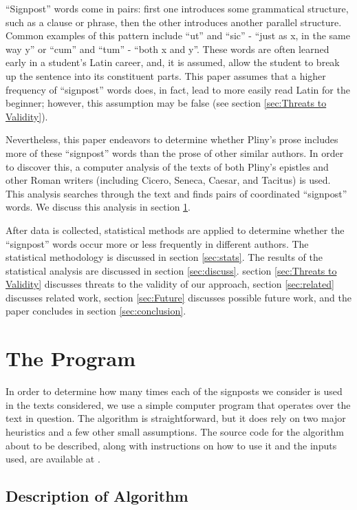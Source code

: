 ``Signpost'' words come in pairs: first one introduces some grammatical structure, such as a clause or phrase, then the other introduces another parallel structure. Common examples of this pattern include ``ut'' and ``sic'' - ``just as x, in the same way y'' or ``cum'' and ``tum'' - ``both x and y''. These words are often learned early in a student's Latin career, and, it is assumed, allow the student to break up the sentence into its constituent parts. This paper assumes that a higher frequency of ``signpost'' words does, in fact, lead to more easily read Latin for the beginner; however, this assumption may be false (see section \ref{sec:Threats to Validity}).

Nevertheless, this paper endeavors to determine whether Pliny's prose includes more of these ``signpost'' words than the prose of other similar authors. In order to discover this, a computer analysis of the texts of both Pliny's epistles and other Roman writers (including Cicero, Seneca, Caesar, and Tacitus) is used. This analysis searches through the text and finds pairs of coordinated ``signpost'' words. We discuss this analysis in section \ref{sec:The Program}.
 
After data is collected, statistical methods are applied to determine whether the ``signpost'' words occur more or less frequently in different authors. The statistical methodology is discussed in section \ref{sec:stats}. The results of the statistical analysis are discussed in section \ref{sec:discuss}. section \ref{sec:Threats to Validity} discusses threats to the validity of our approach, section \ref{sec:related} discusses related work, section \ref{sec:Future} discusses possible future work, and the paper concludes in section \ref{sec:conclusion}.

\section{The Program}
\label{sec:The Program}

In order to determine how many times each of the signposts we consider is used in the texts considered, we use a simple computer program that operates over the text in question. The algorithm is straightforward, but it does rely on two major heuristics and a few other small assumptions. The source code for the algorithm about to be described, along with instructions on how to use it and the inputs used, are available at \cite{github}.

\subsection{Description of Algorithm}

